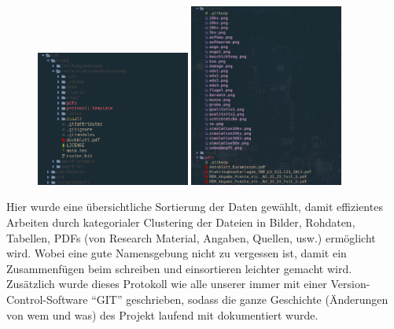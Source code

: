 \documentclass[9pt,english,ngerman]{scrartcl}
\begin{document}
\begin{figure}[H]
	\includegraphics[width=0.45\textwidth]{./foldersmall.png}
	\includegraphics[width=0.45\textwidth,height=6cm]{./picandreferencematerial.png}
\end{figure}

Hier wurde eine übersichtliche Sortierung der Daten gewählt, damit effizientes
Arbeiten durch kategorialer Clustering der Dateien in Bilder, Rohdaten,
Tabellen, PDFs (von Research Material, Angaben, Quellen, usw.) ermöglicht wird.
Wobei eine gute Namensgebung nicht zu vergessen ist, damit ein Zusammenfügen
beim schreiben und einsortieren leichter gemacht wird. Zusätzlich wurde dieses
Protokoll wie alle unserer immer mit einer Version-Control-Software ``GIT''
geschrieben, sodass die ganze Geschichte (Änderungen von wem und was) des
Projekt laufend mit dokumentiert wurde.
\end{document}
